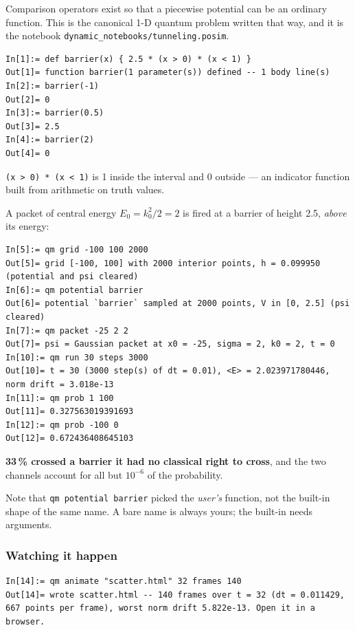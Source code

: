 \documentclass[11pt]{article}
\newcommand{\code}[1]{\texttt{#1}}
\begin{document}
Comparison operators exist so that a piecewise potential can be an
ordinary function. This is the canonical 1-D quantum problem written
that way, and it is the notebook
\code{dynamic\_notebooks/tunneling.posim}.

\begin{lstlisting}
In[1]:= def barrier(x) { 2.5 * (x > 0) * (x < 1) }
Out[1]= function barrier(1 parameter(s)) defined -- 1 body line(s)
In[2]:= barrier(-1)
Out[2]= 0
In[3]:= barrier(0.5)
Out[3]= 2.5
In[4]:= barrier(2)
Out[4]= 0
\end{lstlisting}

\code{(x > 0) * (x < 1)} is 1 inside the interval and 0 outside --- an
indicator function built from arithmetic on truth values.

A packet of central energy $E_0=k_0^2/2=2$ is fired at a barrier of
height 2.5, \emph{above} its energy:

\begin{lstlisting}
In[5]:= qm grid -100 100 2000
Out[5]= grid [-100, 100] with 2000 interior points, h = 0.099950 (potential and psi cleared)
In[6]:= qm potential barrier
Out[6]= potential `barrier` sampled at 2000 points, V in [0, 2.5] (psi cleared)
In[7]:= qm packet -25 2 2
Out[7]= psi = Gaussian packet at x0 = -25, sigma = 2, k0 = 2, t = 0
In[10]:= qm run 30 steps 3000
Out[10]= t = 30 (3000 step(s) of dt = 0.01), <E> = 2.023971780446, norm drift = 3.018e-13
In[11]:= qm prob 1 100
Out[11]= 0.327563019391693
In[12]:= qm prob -100 0
Out[12]= 0.672436408645103
\end{lstlisting}

\textbf{33\,\% crossed a barrier it had no classical right to cross},
and the two channels account for all but $10^{-6}$ of the probability.

Note that \code{qm potential barrier} picked the \emph{user's} function,
not the built-in shape of the same name. A bare name is always yours;
the built-in needs arguments.

\subsubsection*{Watching it happen}

\begin{lstlisting}
In[14]:= qm animate "scatter.html" 32 frames 140
Out[14]= wrote scatter.html -- 140 frames over t = 32 (dt = 0.011429, 667 points per frame), worst norm drift 5.822e-13. Open it in a browser.
\end{lstlisting}
\end{document}
